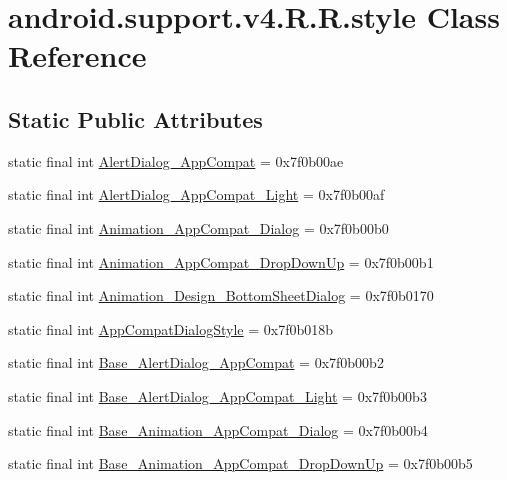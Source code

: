 \hypertarget{classandroid_1_1support_1_1v4_1_1_r_1_1style}{
\section{android.support.v4.R.R.style Class Reference}
\label{classandroid_1_1support_1_1v4_1_1_r_1_1style}
}
\subsection*{Static Public Attributes}
\begin{CompactItemize}
\item 
static final int \hyperlink{classandroid_1_1support_1_1v4_1_1_r_1_1style_ba2e4db805b21c564cddf9f822504a02}{AlertDialog\_\-AppCompat} = 0x7f0b00ae
\item 
static final int \hyperlink{classandroid_1_1support_1_1v4_1_1_r_1_1style_80de99cfd4ddf02c0e3af93aec85c89d}{AlertDialog\_\-AppCompat\_\-Light} = 0x7f0b00af
\item 
static final int \hyperlink{classandroid_1_1support_1_1v4_1_1_r_1_1style_4906f4b429ad47327a9f4d1145ab386f}{Animation\_\-AppCompat\_\-Dialog} = 0x7f0b00b0
\item 
static final int \hyperlink{classandroid_1_1support_1_1v4_1_1_r_1_1style_1fcafa4d35173604c5c88860d44d92f9}{Animation\_\-AppCompat\_\-DropDownUp} = 0x7f0b00b1
\item 
static final int \hyperlink{classandroid_1_1support_1_1v4_1_1_r_1_1style_a4466351c1a712b377194bd27a08c1b8}{Animation\_\-Design\_\-BottomSheetDialog} = 0x7f0b0170
\item 
static final int \hyperlink{classandroid_1_1support_1_1v4_1_1_r_1_1style_806ed366076fb293bcc64903cf1b66a2}{AppCompatDialogStyle} = 0x7f0b018b
\item 
static final int \hyperlink{classandroid_1_1support_1_1v4_1_1_r_1_1style_ec0be138fb4f8c2b99ea7f2c525761ae}{Base\_\-AlertDialog\_\-AppCompat} = 0x7f0b00b2
\item 
static final int \hyperlink{classandroid_1_1support_1_1v4_1_1_r_1_1style_2b88971a45148f7465aaa169db2e6ebe}{Base\_\-AlertDialog\_\-AppCompat\_\-Light} = 0x7f0b00b3
\item 
static final int \hyperlink{classandroid_1_1support_1_1v4_1_1_r_1_1style_b0f5cdc13ef3fd2e2e789726f3484302}{Base\_\-Animation\_\-AppCompat\_\-Dialog} = 0x7f0b00b4
\item 
static final int \hyperlink{classandroid_1_1support_1_1v4_1_1_r_1_1style_b82b1ee3e01da890758a93749be9db7e}{Base\_\-Animation\_\-AppCompat\_\-DropDownUp} = 0x7f0b00b5

\end{CompactItemize}
